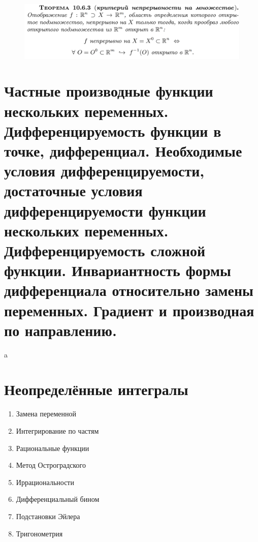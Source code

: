 \documentclass{article}
\begin{document}
\newpage
\begin{figure}[h!]
    \centering
    \includegraphics[width=\textwidth]{32.png}
    \vspace{-1cm}
\end{figure}

\newpage
\section{\color{RedViolet}\textbf{Частные производные функции нескольких переменных. Дифференцируемость функции в точке, дифференциал. Необходимые условия дифференцируемости, достаточные условия дифференцируемости функции нескольких переменных. Дифференцируемость сложной функции. Инвариантность формы дифференциала относительно замены переменных. Градиент и производная по направлению.}}

a
\newpage
\section{\color{RedViolet}\textbf{Неопределённые интегралы}}
\begin{enumerate}
    \item Замена переменной 
    \item Интегрирование по частям
    \item Рациональные функции
    \item Метод Остроградского
    \item Иррациональности
    \item Дифференциальный бином
    \item Подстановки Эйлера
    \item Тригонометрия
\end{enumerate}
\end{document}
